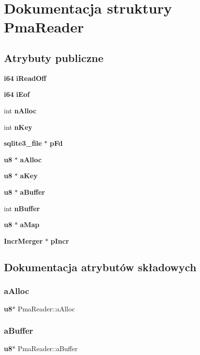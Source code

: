 \section{Dokumentacja struktury Pma\+Reader}
\label{struct_pma_reader}
\subsection*{Atrybuty publiczne}
\begin{DoxyCompactItemize}
\item 
\textbf{ i64} \textbf{ i\+Read\+Off}
\item 
\textbf{ i64} \textbf{ i\+Eof}
\item 
int \textbf{ n\+Alloc}
\item 
int \textbf{ n\+Key}
\item 
\textbf{ sqlite3\+\_\+file} $\ast$ \textbf{ p\+Fd}
\item 
\textbf{ u8} $\ast$ \textbf{ a\+Alloc}
\item 
\textbf{ u8} $\ast$ \textbf{ a\+Key}
\item 
\textbf{ u8} $\ast$ \textbf{ a\+Buffer}
\item 
int \textbf{ n\+Buffer}
\item 
\textbf{ u8} $\ast$ \textbf{ a\+Map}
\item 
\textbf{ Incr\+Merger} $\ast$ \textbf{ p\+Incr}
\end{DoxyCompactItemize}


\subsection{Dokumentacja atrybutów składowych}
\mbox{\label{struct_pma_reader_af8d5ac60d1ba7ff84e84d5eb6aba4447}} 
\subsubsection{aAlloc}
{\footnotesize\ttfamily \textbf{ u8}$\ast$ Pma\+Reader\+::a\+Alloc}

\mbox{\label{struct_pma_reader_acd2a7f3e0375a3f8dfa9e565d080e2c2}} 
\subsubsection{aBuffer}
{\footnotesize\ttfamily \textbf{ u8}$\ast$ Pma\+Reader\+::a\+Buffer}

